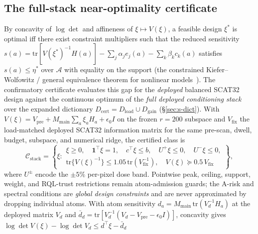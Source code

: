 \documentclass[10pt]{article}
\begin{document}
\subsection{The full-stack near-optimality certificate}
By concavity of $\log\det$ and affineness of $\xi\mapsto V(\xi)$, a feasible
design $\xi^\ast$ is optimal iff there exist constraint multipliers such that
the reduced sensitivity
$s(a) = \mathrm{tr}[V(\xi^\ast)^{-1}H(a)] - \sum_j\alpha_j e_j(a)
- \sum_k\beta_k c_k(a)$ satisfies $s(a) \le \eta^\ast$ over $\mathcal{A}$ with
equality on the support (the constrained Kiefer--Wolfowitz / general
equivalence theorem for nonlinear
models~\cite{kiefer1959optimum,white1973equivalence}). The confirmatory
certificate evaluates this gap for the \emph{deployed} balanced \textsc{SCAT32}
design against the continuous optimum of the \emph{full deployed conditioning
stack} over the expanded dictionary
$D_{\mathrm{cert}} = D_{\mathrm{load}}\cup D_{\mathrm{gain}}$
(\S\ref{sec:s-dict}). With
$V(\xi) = V_{\mathrm{pre}} + M_{\mathrm{main}}\sum_{a} \xi_a H_a
+ \epsilon_0 I$ on the frozen $r = 200$ subspace and $V_{\mathrm{fix}}$ the
load-matched deployed \textsc{SCAT32} information matrix for the same
pre-scan, dwell, budget, subspace, and numerical ridge, the certified class
is
\begin{equation}
  \mathcal{C}_{\mathrm{stack}} = \left\{\xi:
  \begin{array}{l}
  \xi \ge 0,\quad \mathbf{1}^{\top}\xi = 1,\quad c^{\top}\xi \le b,\quad
  U^{+}\xi \le 0,\quad U^{-}\xi \le 0,\\[2pt]
  \mathrm{tr}\{V(\xi)^{-1}\} \le 1.05\,\mathrm{tr}(V_{\mathrm{fix}}^{-1}),
  \quad V(\xi) \succeq 0.5\,V_{\mathrm{fix}}
  \end{array}\right\},
  \label{eq:s-cstack}
\end{equation}
where $U^{\pm}$ encode the $\pm5\%$ per-pixel dose band. Pointwise peak,
ceiling, support, weight, and RQL-trust restrictions remain atom-admission
guards; the A-risk and spectral conditions are \emph{global design
constraints} and are never approximated by dropping individual atoms. With
atom sensitivity $d_a = M_{\mathrm{main}}\,\mathrm{tr}(V_d^{-1}H_a)$ at the
deployed matrix $V_d$ and
$\bar d_d = \mathrm{tr}[V_d^{-1}(V_d - V_{\mathrm{pre}} - \epsilon_0 I)]$,
concavity gives $\log\det V(\xi) - \log\det V_d \le d^{\top}\xi - \bar d_d$
\end{document}
